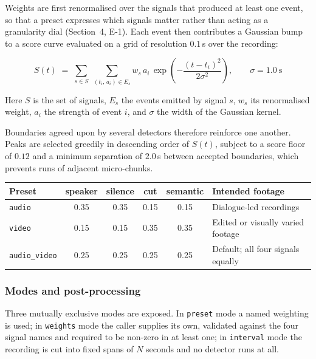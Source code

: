 Weights are first renormalised over the signals that produced at least one event, so
that a preset expresses which signals matter rather than acting as a granularity
dial (Section~4, E-1). Each event then contributes a Gaussian bump to a score curve
evaluated on a grid of resolution $0.1$\,s over the recording:

\[
S(t) \;=\; \sum_{s \in S} \; \sum_{(t_i,\, a_i) \in E_s}
w_s \, a_i \, \exp\!\left(-\frac{(t - t_i)^2}{2\sigma^2}\right),
\qquad \sigma = 1.0\ \mathrm{s}
\]

Here $S$ is the set of signals, $E_s$ the events emitted by signal $s$, $w_s$ its
renormalised weight, $a_i$ the strength of event $i$, and $\sigma$ the width of the
Gaussian kernel.

Boundaries agreed upon by several detectors therefore reinforce one another. Peaks are
selected greedily in descending order of $S(t)$, subject to a score floor of $0.12$ and
a minimum separation of $2.0$\,s between accepted boundaries, which prevents runs of
adjacent micro-chunks.

\begin{table}[htbp]
\centering
\small
\begin{tabularx}{\textwidth}{@{}L{2.6cm}cccc X@{}}
\toprule
\textbf{Preset} & \textbf{speaker} & \textbf{silence} & \textbf{cut} & \textbf{semantic} & \textbf{Intended footage} \\
\midrule
\texttt{audio}       & 0.35 & 0.35 & 0.15 & 0.15 & Dialogue-led recordings \\
\texttt{video}       & 0.15 & 0.15 & 0.35 & 0.35 & Edited or visually varied footage \\
\texttt{audio\_video} & 0.25 & 0.25 & 0.25 & 0.25 & Default; all four signals equally \\
\bottomrule
\end{tabularx}
\end{table}

\subsubsection*{Modes and post-processing}

Three mutually exclusive modes are exposed. In \texttt{preset} mode a named weighting is
used; in \texttt{weights} mode the caller supplies its own, validated against the four
signal names and required to be non-zero in at least one; in \texttt{interval} mode the
recording is cut into fixed spans of $N$ seconds and no detector runs at all.

